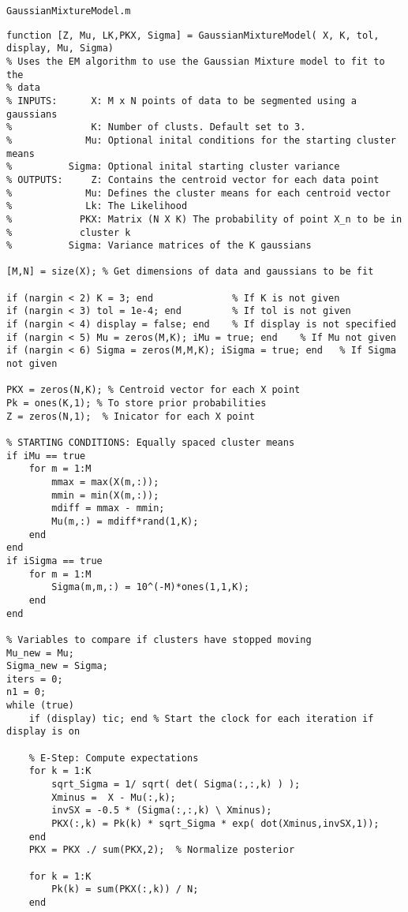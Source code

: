 \documentclass{article}
\begin{document}

\texttt{GaussianMixtureModel.m}
\begin{lstlisting}
function [Z, Mu, LK,PKX, Sigma] = GaussianMixtureModel( X, K, tol, display, Mu, Sigma)
% Uses the EM algorithm to use the Gaussian Mixture model to fit to the
% data
% INPUTS:      X: M x N points of data to be segmented using a gaussians
%              K: Number of clusts. Default set to 3.
%             Mu: Optional inital conditions for the starting cluster means
%          Sigma: Optional inital starting cluster variance
% OUTPUTS:     Z: Contains the centroid vector for each data point
%             Mu: Defines the cluster means for each centroid vector
%             Lk: The Likelihood
%            PKX: Matrix (N X K) The probability of point X_n to be in
%            cluster k
%          Sigma: Variance matrices of the K gaussians

[M,N] = size(X); % Get dimensions of data and gaussians to be fit

if (nargin < 2) K = 3; end              % If K is not given
if (nargin < 3) tol = 1e-4; end         % If tol is not given
if (nargin < 4) display = false; end    % If display is not specified
if (nargin < 5) Mu = zeros(M,K); iMu = true; end    % If Mu not given
if (nargin < 6) Sigma = zeros(M,M,K); iSigma = true; end   % If Sigma not given

PKX = zeros(N,K); % Centroid vector for each X point
Pk = ones(K,1); % To store prior probabilities
Z = zeros(N,1);  % Inicator for each X point

% STARTING CONDITIONS: Equally spaced cluster means
if iMu == true
    for m = 1:M
        mmax = max(X(m,:));
        mmin = min(X(m,:));
        mdiff = mmax - mmin;
        Mu(m,:) = mdiff*rand(1,K);
    end
end
if iSigma == true
    for m = 1:M
        Sigma(m,m,:) = 10^(-M)*ones(1,1,K);
    end
end

% Variables to compare if clusters have stopped moving
Mu_new = Mu;
Sigma_new = Sigma;
iters = 0;
n1 = 0;
while (true)
    if (display) tic; end % Start the clock for each iteration if display is on
    
    % E-Step: Compute expectations
    for k = 1:K
        sqrt_Sigma = 1/ sqrt( det( Sigma(:,:,k) ) );
        Xminus =  X - Mu(:,k);
        invSX = -0.5 * (Sigma(:,:,k) \ Xminus);
        PKX(:,k) = Pk(k) * sqrt_Sigma * exp( dot(Xminus,invSX,1));
    end
    PKX = PKX ./ sum(PKX,2);  % Normalize posterior

    for k = 1:K
        Pk(k) = sum(PKX(:,k)) / N;
    end


\end{lstlisting}
\end{document}
